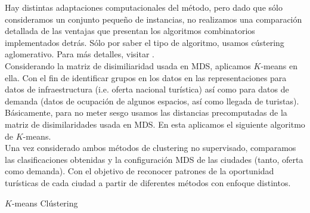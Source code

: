 \documentclass[11pt,letterpaper]{article}
\begin{document}
Hay distintas adaptaciones computacionales del método, pero dado que sólo consideramos un conjunto pequeño de instancias, no realizamos una comparación detallada de las ventajas que presentan los algoritmos combinatorios implementados detrás. Sólo por saber el tipo de algoritmo, usamos cústering aglomerativo. Para más detalles, visitar \cite{book:646}.\\

Considerando la matriz de disimiliaridad usada en MDS, aplicamos $K$-means en ella. Con el fin de identificar grupos en los datos en las representaciones para datos de infraestructura (i.e. oferta nacional turística) así como para datos de demanda (datos de ocupación de algunos espacios, así como llegada de turistas). Básicamente, para no meter sesgo usamos las distancias precomputadas de la matriz de disimilaridades usada en MDS. En esta aplicamos el siguiente algoritmo de $K$-means.\\

Una vez considerado ambos métodos de clustering no supervisado, comparamos las clasificaciones obtenidas y la configuración MDS de las ciudades (tanto, oferta como demanda). Con el objetivo de reconocer patrones de la oportunidad turísticas de cada ciudad a partir de diferentes métodos con enfoque distintos. 
\begin{algorithm}[H]
\SetAlgoLined
{}
 \caption{$K$-means Clústering}
\end{algorithm}
\end{document}
